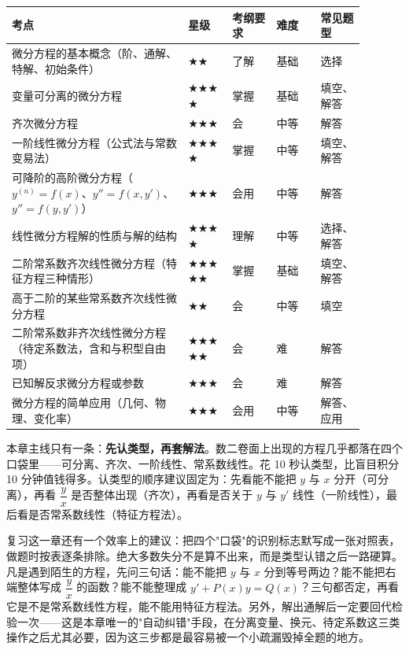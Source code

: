 \documentclass[11pt,openany,UTF8]{ctexbook}
\begin{document}
\begingroup\small\setlength{\tabcolsep}{4.0pt}
\begin{longtable}{@{}L{0.4471\linewidth}L{0.1118\linewidth}L{0.1118\linewidth}L{0.1118\linewidth}L{0.1118\linewidth}@{}}
\toprule
\textbf{考点} & \textbf{星级} & \textbf{考纲要求} & \textbf{难度} & \textbf{常见题型} \\
\midrule
\endhead
微分方程的基本概念（阶、通解、特解、初始条件） & $\bigstar$$\bigstar$ & 了解 & 基础 & 选择 \\
变量可分离的微分方程 & $\bigstar$$\bigstar$$\bigstar$$\bigstar$ & 掌握 & 基础 & 填空、解答 \\
齐次微分方程 & $\bigstar$$\bigstar$$\bigstar$ & 会 & 中等 & 解答 \\
一阶线性微分方程（公式法与常数变易法） & $\bigstar$$\bigstar$$\bigstar$$\bigstar$ & 掌握 & 中等 & 填空、解答 \\
可降阶的高阶微分方程（$y^{(n)}=f(x)$、$y''=f(x,y')$、$y''=f(y,y')$） & $\bigstar$$\bigstar$$\bigstar$ & 会用 & 中等 & 解答 \\
线性微分方程解的性质与解的结构 & $\bigstar$$\bigstar$$\bigstar$$\bigstar$ & 理解 & 中等 & 选择、解答 \\
二阶常系数齐次线性微分方程（特征方程三种情形） & $\bigstar$$\bigstar$$\bigstar$$\bigstar$$\bigstar$ & 掌握 & 基础 & 填空、解答 \\
高于二阶的某些常系数齐次线性微分方程 & $\bigstar$$\bigstar$ & 会 & 中等 & 填空 \\
二阶常系数非齐次线性微分方程（待定系数法，含和与积型自由项） & $\bigstar$$\bigstar$$\bigstar$$\bigstar$$\bigstar$ & 会 & 难 & 解答 \\
已知解反求微分方程或参数 & $\bigstar$$\bigstar$$\bigstar$ & 会 & 难 & 解答 \\
微分方程的简单应用（几何、物理、变化率） & $\bigstar$$\bigstar$$\bigstar$ & 会用 & 中等 & 解答、应用 \\
\bottomrule
\end{longtable}
\endgroup

本章主线只有一条：\textbf{先认类型，再套解法}。数二卷面上出现的方程几乎都落在四个口袋里——可分离、齐次、一阶线性、常系数线性。花 10 秒认类型，比盲目积分 10 分钟值钱得多。认类型的顺序建议固定为：先看能不能把 $y$ 与 $x$ 分开（可分离），再看 $\dfrac yx$ 是否整体出现（齐次），再看是否关于 $y$ 与 $y'$ 线性（一阶线性），最后看是否常系数线性（特征方程法）。

复习这一章还有一个效率上的建议：把四个"口袋"的识别标志默写成一张对照表，做题时按表逐条排除。绝大多数失分不是算不出来，而是类型认错之后一路硬算。凡是遇到陌生的方程，先问三句话：能不能把 $y$ 与 $x$ 分到等号两边？能不能把右端整体写成 $\dfrac yx$ 的函数？能不能整理成 $y'+P(x)y=Q(x)$？三句都否定，再看它是不是常系数线性方程，能不能用特征方程法。另外，解出通解后一定要回代检验一次——这是本章唯一的"自动纠错"手段，在分离变量、换元、待定系数这三类操作之后尤其必要，因为这三步都是最容易被一个小疏漏毁掉全题的地方。
\end{document}
